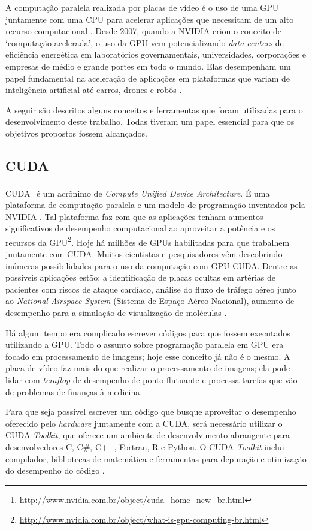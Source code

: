 \documentclass[
	12pt,				%
	twoside,			%
	a4paper,			%
	english,			%
	french,				%
	spanish,			%
	brazil				%
	]{abntex2}
\begin{document}
A computação paralela realizada por placas de vídeo é o uso de uma GPU
juntamente com uma CPU para acelerar aplicações que necessitam de um
alto recurso computacional \cite{KIRK}. Desde 2007, quando a NVIDIA
criou o conceito de `computação acelerada', o uso da GPU vem
potencializando \emph{data centers} de eficiência energética em
laboratórios governamentais, universidades, corporações e empresas de
médio e grande portes em todo o mundo. Elas desempenham um papel
fundamental na aceleração de aplicações em plataformas que variam de
inteligência artificial até carros, drones e robôs \cite{NVIDIA}.

A seguir são descritos alguns conceitos e ferramentas que foram
utilizadas para o desenvolvimento deste trabalho. Todas tiveram um papel
essencial para que os objetivos propostos fossem alcançados.

\subsection{CUDA}\label{cuda}

CUDA\footnote{\url{http://www.nvidia.com.br/object/cuda_home_new_br.html}}
é um acrônimo de \emph{Compute Unified Device Architecture}. É uma
plataforma de computação paralela e um modelo de programação inventados
pela NVIDIA \cite{NVIDIA}. Tal plataforma faz com que as aplicações
tenham aumentos significativos de desempenho computacional ao aproveitar
a potência e os recursos da GPU\footnote{\url{http://www.nvidia.com.br/object/what-is-gpu-computing-br.html}}.
Hoje há milhões de GPUs habilitadas para que trabalhem juntamente com
CUDA. Muitos cientistas e pesquisadores vêm descobrindo inúmeras
possibilidades para o uso da computação com GPU CUDA. Dentre as
possíveis aplicações estão: a identificação de placas ocultas em
artérias de pacientes com riscos de ataque cardíaco, análise do fluxo de
tráfego aéreo junto ao \emph{National Airspace System} (Sistema de
Espaço Aéreo Nacional), aumento de desempenho para a simulação de
visualização de moléculas \cite{KIRK}.

Há algum tempo era complicado escrever códigos para que fossem
executados utilizando a GPU. Todo o assunto sobre programação paralela
em GPU era focado em processamento de imagens; hoje esse conceito já não
é o mesmo. A placa de vídeo faz mais do que realizar o processamento de
imagens; ela pode lidar com \emph{teraflop} de desempenho de ponto
flutuante e processa tarefas que vão de problemas de finanças à
medicina.

Para que seja possível escrever um código que busque aproveitar o
desempenho oferecido pelo \emph{hardware} juntamente com a CUDA, será
necessário utilizar o CUDA \emph{Toolkit}, que oferece um ambiente de
desenvolvimento abrangente para desenvolvedores C, C\#, C++, Fortran, R
e Python. O CUDA \emph{Toolkit} inclui compilador, bibliotecas de
matemática e ferramentas para depuração e otimização do desempenho do
código \cite{FARBER}.
\end{document}
